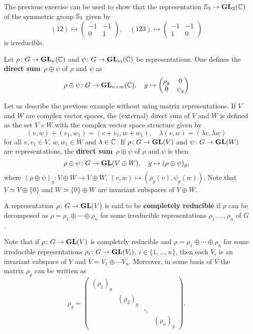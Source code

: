 The previous exercise can be used to show that the representation
$\mathbb{S}_3\to\mathbf{GL}_2(\mathbb{C})$
of the symmetric group $\mathbb{S}_3$
given by
\[
(12)\mapsto\begin{pmatrix}
-1&-1\\0&1
\end{pmatrix},
\quad
(123)\mapsto\begin{pmatrix}
-1&-1\\
1&0
\end{pmatrix}
\]
is irreducible.

\begin{example}
Let $\rho\colon G\to\mathbf{GL}_n(\mathbb{C})$ and $\psi\colon G\to\mathbf{GL}_m(\mathbb{C})$ be representations. One defines
the \textbf{direct sum} $\rho\oplus\psi$ of $\rho$ and $\psi$ as 
\[
\rho\oplus\psi\colon G\to\mathbf{GL}_{n+m}(\mathbb{C}),\quad
g\mapsto 
\begin{pmatrix}
\rho_g & 0\\
0 & \psi_g	
\end{pmatrix}
\]
\end{example}

Let us describe the previous example without using matrix representations. If $V$ and 
$W$ are complex vector spaces, the (external) direct sum of $V$ and $W$ is defined
as the set $V\times W$ with the complex vector space structure given by
\[
(v,w)+(v_1,w_1)=(v+v_1,w+w_1),\quad
\lambda (v,w)=(\lambda v,\lambda w)
\]
for all $v,v_1\in V$, $w,w_1\in W$ and $\lambda\in\mathbb{C}$. 
If $\rho\colon G\to\mathbf{GL}(V)$ and $\psi\colon G\to\mathbf{GL}(W)$ are representations, 
the \textbf{direct sum} $\rho\oplus\psi$ of $\rho$ and $\psi$ is then 
\[
\rho\oplus\psi\colon G\to\mathbf{GL}(V\oplus W),\quad
g\mapsto (\rho\oplus\psi)_g,
\]
where $(\rho\oplus\psi)_g\colon V\oplus W\to V\oplus W$, 
$(v,w)\mapsto (\rho_g(v),\psi_g(w))$. Note that
$V\simeq V\oplus\{0\}$ and $W\simeq \{0\}\oplus W$ are
invariant subspaces of $V\oplus W$. 

\begin{definition}
    A representation $\rho\colon G\to\mathbf{GL}(V)$ is said to be 
    \textbf{completely reducible}
    if $\rho$ can be decomposed as
    $\rho=\rho_1\oplus\cdots\oplus \rho_n$ for some irreducible
    representations $\rho_1,\dots,\rho_n$ of $G$. 
\end{definition}

Note that if $\rho\colon G\to\mathbf{GL}(V)$ is completely reducible and 
$\rho=\rho_1\oplus\cdots\oplus \rho_n$ for some irreducible representations 
$\rho_i\colon G\to\mathbf{GL}(V_i)$, $i\in\{1,\dots,n\}$, then 
each $V_i$ is an invariant subspace of $V$ and $V=V_1\oplus \cdots V_n$. 
Moreover, in some basis of $V$ the matrix  
$\rho_g$ can be written as 
\[
\rho_g=\begin{pmatrix}
(\rho_1)_g &  \\
& (\rho_2)_g  \\
&&\ddots\\
&&&(\rho_n)_g	
\end{pmatrix}.
\]

